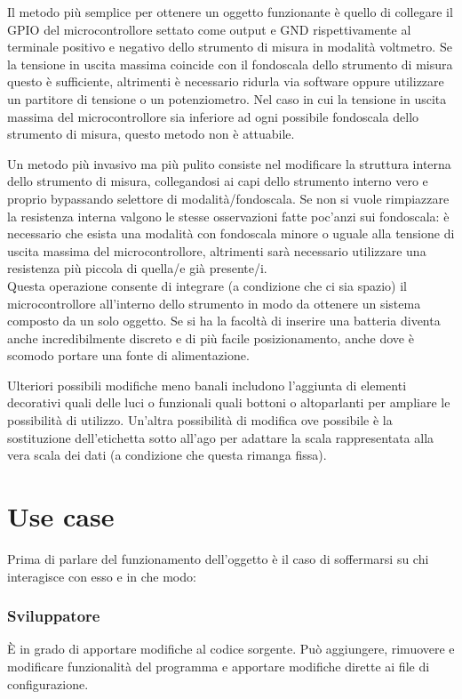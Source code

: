 \documentclass[12pt,a4paper]{report}
\begin{document}
Il metodo più semplice per ottenere un oggetto funzionante è quello di collegare il GPIO del microcontrollore settato come output
e GND rispettivamente al terminale positivo e negativo dello strumento di misura in modalità voltmetro. Se la tensione in uscita massima
coincide con il fondoscala dello strumento di misura questo è sufficiente, altrimenti è necessario ridurla via software oppure
utilizzare un partitore di tensione o un potenziometro. Nel caso in cui la tensione in uscita massima del microcontrollore sia inferiore
ad ogni possibile fondoscala dello strumento di misura, questo metodo non è attuabile.

Un metodo più invasivo ma più pulito consiste nel modificare la struttura interna dello strumento di misura, collegandosi ai capi dello
strumento interno vero e proprio bypassando selettore di modalità/fondoscala.
Se non si vuole rimpiazzare la resistenza interna valgono le stesse osservazioni fatte poc'anzi sui fondoscala: è necessario che
esista una modalità con fondoscala minore o uguale alla tensione di uscita massima del microcontrollore, altrimenti sarà necessario
utilizzare una resistenza più piccola di quella/e già presente/i. \\
Questa operazione consente di integrare (a condizione che ci sia spazio) il microcontrollore all'interno dello strumento in modo da
ottenere un sistema composto da un solo oggetto. Se si ha la facoltà di inserire una batteria diventa anche incredibilmente discreto
e di più facile posizionamento, anche dove è scomodo portare una fonte di alimentazione.

Ulteriori possibili modifiche meno banali includono l'aggiunta di elementi decorativi quali delle luci o funzionali quali bottoni o altoparlanti
per ampliare le possibilità di utilizzo. Un'altra possibilità di modifica ove possibile è la sostituzione dell'etichetta sotto all'ago per adattare
la scala rappresentata alla vera scala dei dati (a condizione che questa rimanga fissa).


\chapter{Use case}
Prima di parlare del funzionamento dell'oggetto è il caso di soffermarsi su chi interagisce con esso e in che modo:  %
\subsection*{Sviluppatore}
È in grado di apportare modifiche al codice sorgente. Può aggiungere, rimuovere e  modificare funzionalità del programma
e apportare modifiche dirette ai file di configurazione.
\end{document}
